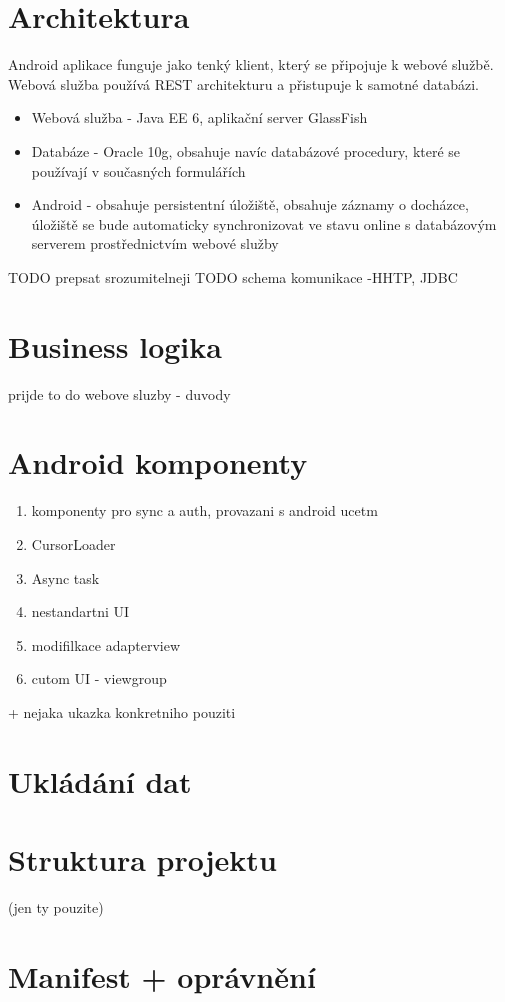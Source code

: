 \documentclass{bakalarka}
\begin{document}
\section{Architektura}
Android aplikace funguje jako tenký klient, který se připojuje k webové službě. Webová služba používá REST architekturu a přistupuje k samotné databázi.



\begin{itemize}
\item Webová služba - Java EE 6, aplikační server GlassFish
\item Databáze - Oracle 10g, obsahuje navíc databázové procedury, které se používají v současných formulářích  
\item Android - obsahuje persistentní úložiště, obsahuje záznamy o docházce, úložiště se bude automaticky synchronizovat ve stavu online s databázovým serverem prostřednictvím webové služby
\end{itemize}
TODO prepsat srozumitelneji
TODO schema komunikace -HHTP, JDBC

\section{Business logika}
prijde to do webove sluzby - duvody


\section{Android komponenty}
\begin{enumerate}
\item komponenty pro sync a auth, provazani s android ucetm
\item CursorLoader
\item Async task
\item  nestandartni UI
\item modifilkace adapterview
\item cutom UI - viewgroup
\end{enumerate}
+ nejaka ukazka konkretniho pouziti

\section{Ukládání dat}
\section{Struktura projektu}
(jen ty pouzite)
\section{Manifest + oprávnění}
\end{document}

